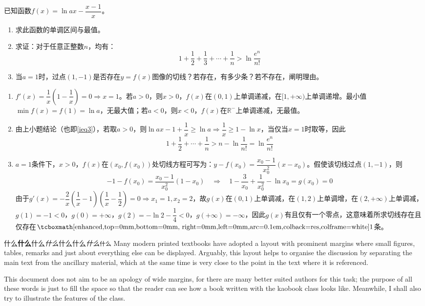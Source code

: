 \begin{que}
	已知函数$f(x)=\ln ax-\dfrac{x-1}{x}$。
	\begin{enumerate}
		\item 求此函数的单调区间与最值。
		\item 求证：对于任意正整数$n$，均有：$$1+\dfrac{1}{2}+\dfrac{1}{3}+\cdots+\dfrac{1}{n}> \ln\dfrac{e^n}{n!}$$
		\item 当$a=1$时，过点$(1,-1)$是否存在$y=f(x)$图像的切线？若存在，有多少条？若不存在，阐明理由。
	\end{enumerate}
\end{que}
\sol 	\begin{enumerate}
	\item $f'(x)=\dfrac{1}{x}\left(1-\dfrac{1}{x}\right)=0 \Rightarrow x=1$。若$a>0$，则$x>0$，$f(x)$在$(0,1)$上单调递减，在$[1,+\infty)$上单调递增。最小值$\min f(x)=f(1)=\ln a$，无最大值；若$a<0$，则$x<0$，$f(x)$在$\mathbb{R}^-$上单调递减，无最值。
	\item 由上小题结论（也即\ref{ieq3}），若取$a>0$，则$\ln ax-1+\dfrac{1}{x}\geqslant\ln a\Rightarrow \dfrac{1}{x}\geqslant 1-\ln x$，当仅当$x=1$时取等，因此$$1+\dfrac{1}{2}+\cdots+\dfrac{1}{n}> n-\ln\dfrac{1}{n!}=\ln\dfrac{e^n}{n!}$$
	\item $a=1$条件下，$x>0$，$f(x)$在$(x_0,f(x_0))$处切线方程可写为：$y-f(x_0)=\dfrac{x_0-1}{x_0^2}(x-x_0)$。假使该切线过点$(1,-1)$，则$$-1-f(x_0)=\dfrac{x_0-1}{x_0^2}(1-x_0)\quad\Rightarrow\quad1-\dfrac{3}{x_0}+\dfrac{1}{x_0^2}-\ln x_0=g(x_0)=0$$
	由于$g'(x)=-\dfrac{2}{x}\left(\dfrac{1}{x}-1\right)\left(\dfrac{1}{x}-\dfrac{1}{2}\right)=0\Rightarrow x_1=1,x_2=2$，故$g(x)$在$(0,1)$上单调减，在$(1,2)$上单调增，在$(2,+\infty)$上单调减，$g(1)=-1<0$，$g(0)=+\infty$，$g(2)=-\ln 2-\dfrac{1}{4}<0$，$g(+\infty)=-\infty$，因此$g(x)$有且仅有一个零点，这意味着所求切线存在且仅存在$\res{1}$条。
\end{enumerate}\par\hfill{}\easy

什么\textbf{什么}\textsf{什么}\textit{什么}\textrm{什么}\textsc{什么}\textsl{什么}\texttt{什么}\easy
Many modern printed textbooks have adopted a layout with prominent 
margins where small figures, tables, remarks and just about everything 
else can be displayed. Arguably, this layout helps to organise the 
	discussion by separating the main text from the ancillary material, 
	which at the same time is very close to the point in the text where 
	it is referenced.

This document does not aim to be an apology of wide margins, for there 
are many better suited authors for this task; the purpose of all these 
words is just to fill the space so that the reader can see how a book 
written with the kaobook class looks like. Meanwhile, I shall also try 
to illustrate the features of the class.

